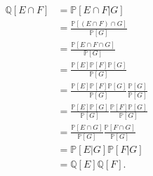\documentclass{article}
\begin{document}
\begin{enumerate}
\begin{align*}
\mathbb{Q}[E\cap F] &= \mathbb{P}[E\cap F | G] \\
&= \frac{\mathbb{P}[(E \cap F)\cap G]}{\mathbb{P}[G]} \\
&= \frac{\mathbb{P}[E \cap F\cap G]}{\mathbb{P}[G]} \\
&= \frac{\mathbb{P}[E]\mathbb{P}[F]\mathbb{P}[G]}{\mathbb{P}[G]} \\
&= \frac{\mathbb{P}[E]\mathbb{P}[F]\mathbb{P}[G]}{\mathbb{P}[G]}\frac{\mathbb{P}[G]}{\mathbb{P}[G]} \\
&= \frac{\mathbb{P}[E]\mathbb{P}[G]}{\mathbb{P}[G]}\frac{\mathbb{P}[F]\mathbb{P}[G]}{\mathbb{P}[G]}\\
&= \frac{\mathbb{P}[E \cap G]}{\mathbb{P}[G]}\frac{\mathbb{P}[F \cap G]}{\mathbb{P}[G]} \\
&= \mathbb{P}[E | G]\mathbb{P}[F | G] \\
&= \mathbb{Q}[E]\mathbb{Q}[F].
\end{align*}


\end{enumerate}
\end{document}
